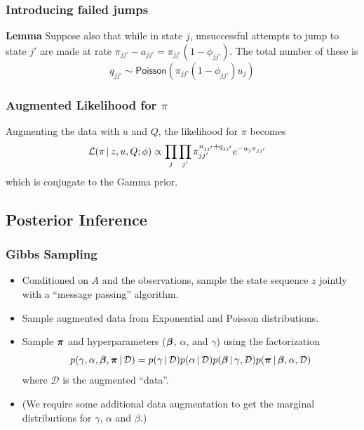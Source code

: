 \documentclass[11pt, mathserif, handout, table]{beamer}
\begin{document}
\begin{frame}
  \frametitle{Introducing failed jumps}
  \begin{exampleblock}{\small 
      {\bf Lemma} Suppose also that while in state $j$, unsuccessful attempts to jump
  to state $j'$ are made at rate $\pi_{jj'} - a_{jj'} = \pi_{jj'}(1 -
  \phi_{jj'})$.  The total number of these is
  \begin{equation}
    \label{eq:19}
    q_{jj'} \sim \mathsf{Poisson}(\pi_{jj'}(1 - \phi_{jj'}) u_j)
  \end{equation}
  }
\end{exampleblock}
\end{frame}
\begin{frame}
  \frametitle{Augmented Likelihood for $\pi$}
  Augmenting the data with $u$ and $Q$, the likelihood for $\pi$ becomes
  \begin{align*}
    \label{eq:20}
    \mathcal{L}(\pi \, \vert \, z, u, Q; \phi) &\propto 
    \prod_{j}\prod_{j'}
    \pi_{jj'}^{n_{jj'} + q_{jj'}} e^{-u_j\pi_{jj'}}
  \end{align*}
  which is conjugate to the Gamma prior.
\end{frame}

\subsection{Posterior Inference}
\begin{frame}
  \frametitle{Gibbs Sampling}
  \begin{itemize}[<+->]
  \item Conditioned on $A$ and the observations, sample the
    state sequence $z$ jointly with a ``message passing'' algorithm.
  \item Sample augmented data from Exponential and Poisson distributions.
  \item Sample $\boldsymbol{\pi}$ and hyperparameters ($\boldsymbol{\beta}$,
    $\alpha$, and $\gamma$) using the factorization
    \begin{equation}
      \label{eq:22}
      p(\gamma, \alpha, \boldsymbol{\beta}, \boldsymbol{\pi} \, \vert \, \mathcal{D}) = p(\gamma
      \, \vert \, \mathcal{D}) p(\alpha \, \vert \, \mathcal{D}) p(\boldsymbol{\beta} \, \vert \,
      \gamma, \mathcal{D}) p(\boldsymbol{\pi} \, \vert \, \boldsymbol{\beta}, \alpha, \mathcal{D})
    \end{equation}
    where $\mathcal{D}$ is the augmented ``data''.
  \item (We require some additional data augmentation to get the
    marginal distributions for $\gamma$, $\alpha$ and $\beta$.)
  \end{itemize}
\end{frame}
\end{document}
